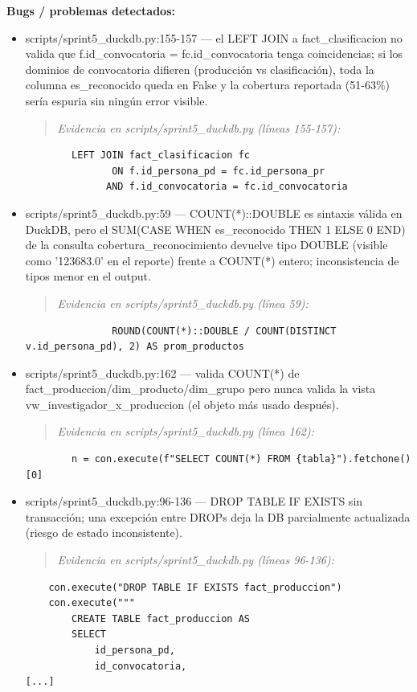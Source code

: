 \begin{tcolorbox}[riesgo]
\textbf{Bugs / problemas detectados:}
\begin{itemize}
  \item scripts/sprint5\_duckdb.py:155-157 --- el LEFT JOIN a fact\_clasificacion no valida que f.id\_convocatoria = fc.id\_convocatoria tenga coincidencias; si los dominios de convocatoria difieren (producción vs clasificación), toda la columna es\_reconocido queda en False y la cobertura reportada (51-63\%) sería espuria sin ningún error visible.
\begin{quote}\footnotesize\ttfamily
\noindent\emph{Evidencia en scripts/sprint5\_duckdb.py (líneas 155-157):}
\end{quote}
\begin{lstlisting}
        LEFT JOIN fact_clasificacion fc
               ON f.id_persona_pd = fc.id_persona_pr
              AND f.id_convocatoria = fc.id_convocatoria
\end{lstlisting}

  \item scripts/sprint5\_duckdb.py:59 --- COUNT(*)::DOUBLE es sintaxis válida en DuckDB, pero el SUM(CASE WHEN es\_reconocido THEN 1 ELSE 0 END) de la consulta cobertura\_reconocimiento devuelve tipo DOUBLE (visible como '123683.0' en el reporte) frente a COUNT(*) entero; inconsistencia de tipos menor en el output.
\begin{quote}\footnotesize\ttfamily
\noindent\emph{Evidencia en scripts/sprint5\_duckdb.py (línea 59):}
\end{quote}
\begin{lstlisting}
               ROUND(COUNT(*)::DOUBLE / COUNT(DISTINCT v.id_persona_pd), 2) AS prom_productos
\end{lstlisting}

  \item scripts/sprint5\_duckdb.py:162 --- valida COUNT(*) de fact\_produccion/dim\_producto/dim\_grupo pero nunca valida la vista vw\_investigador\_x\_produccion (el objeto más usado después).
\begin{quote}\footnotesize\ttfamily
\noindent\emph{Evidencia en scripts/sprint5\_duckdb.py (línea 162):}
\end{quote}
\begin{lstlisting}
        n = con.execute(f"SELECT COUNT(*) FROM {tabla}").fetchone()[0]
\end{lstlisting}

  \item scripts/sprint5\_duckdb.py:96-136 --- DROP TABLE IF EXISTS sin transacción; una excepción entre DROPs deja la DB parcialmente actualizada (riesgo de estado inconsistente).
\begin{quote}\footnotesize\ttfamily
\noindent\emph{Evidencia en scripts/sprint5\_duckdb.py (líneas 96-136):}
\end{quote}
\begin{lstlisting}
    con.execute("DROP TABLE IF EXISTS fact_produccion")
    con.execute("""
        CREATE TABLE fact_produccion AS
        SELECT
            id_persona_pd,
            id_convocatoria,
[...]
\end{lstlisting}


\end{itemize}
\end{tcolorbox}
